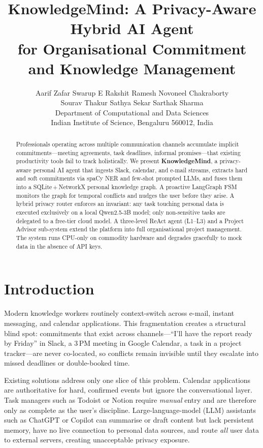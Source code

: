 \documentclass[10pt,twocolumn]{article}
\title{\textbf{KnowledgeMind: A Privacy-Aware Hybrid AI Agent\\
for Organisational Commitment and Knowledge Management}}
\author{%
  Aarif Zafar\quad
  Swarup E\quad
  Rakshit Ramesh\quad
  Novoneel Chakraborty\\
  Sourav Thakur\quad
  Sathya Sekar\quad
  Sarthak Sharma\\[2pt]
  \small Department of Computational and Data Sciences\\
  \small Indian Institute of Science, Bengaluru 560012, India
}
\date{}
\begin{document}
\maketitle
\thispagestyle{empty}

\begin{abstract}
\noindent
Professionals operating across multiple communication channels accumulate
implicit commitments—meeting agreements, task deadlines, informal promises—that
existing productivity tools fail to track holistically.
We present \textbf{KnowledgeMind}, a privacy-aware personal AI agent that
ingests Slack, calendar, and e-mail streams, extracts hard and soft commitments
via spaCy NER and few-shot prompted LLMs, and fuses them into a
SQLite\,+\,NetworkX personal knowledge graph.
A proactive LangGraph FSM monitors the graph for temporal conflicts and nudges
the user before they arise.
A hybrid privacy router enforces an invariant: any task touching personal data
is executed exclusively on a local Qwen2.5-3B model; only non-sensitive tasks
are delegated to a free-tier cloud model.
A three-level ReAct agent (L1–L3) and a Project Advisor sub-system extend the
platform into full organisational project management.
The system runs CPU-only on commodity hardware and degrades gracefully to mock
data in the absence of API keys.
\end{abstract}

\section{Introduction}

Modern knowledge workers routinely context-switch across e-mail, instant
messaging, and calendar applications.
This fragmentation creates a structural blind spot: commitments that exist
across channels—``I'll have the report ready by Friday'' in Slack,
a 3\,PM meeting in Google Calendar, a task in a project tracker—are never
co-located, so conflicts remain invisible until they escalate into missed
deadlines or double-booked time.

Existing solutions address only one slice of this problem.
Calendar applications are authoritative for hard, confirmed events but ignore
the conversational layer.
Task managers such as Todoist or Notion require \emph{manual} entry and are
therefore only as complete as the user's discipline.
Large-language-model (LLM) assistants such as ChatGPT or Copilot can
summarise or draft content but lack persistent memory, have no live connection
to personal data sources, and route \emph{all} user data to external servers,
creating unacceptable privacy exposure.
\end{document}
